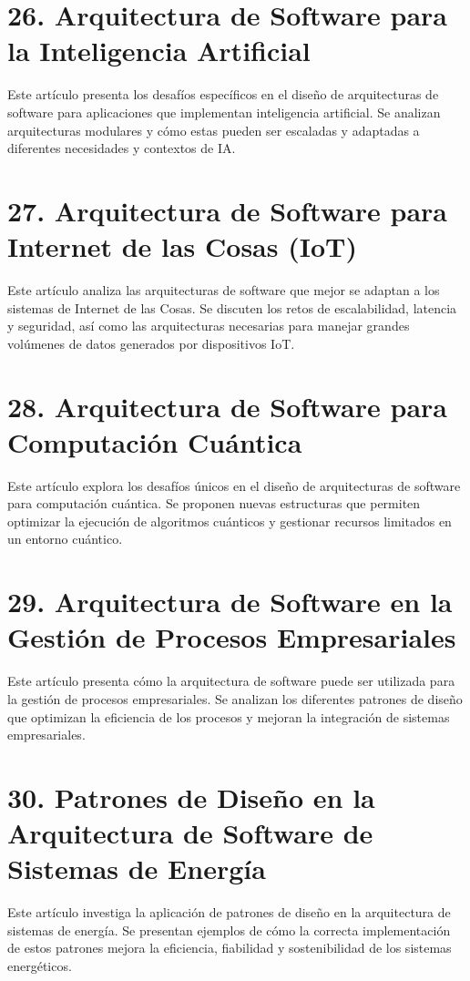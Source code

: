 \documentclass[twocolumn]{article}
\begin{document}
\printbibliography[heading=subbibliography]

\section*{26. Arquitectura de Software para la Inteligencia Artificial}
Este artículo presenta los desafíos específicos en el diseño de arquitecturas de software para aplicaciones que implementan inteligencia artificial. Se analizan arquitecturas modulares y cómo estas pueden ser escaladas y adaptadas a diferentes necesidades y contextos de IA.



\printbibliography[heading=subbibliography]

\section*{27. Arquitectura de Software para Internet de las Cosas (IoT)}
Este artículo analiza las arquitecturas de software que mejor se adaptan a los sistemas de Internet de las Cosas. Se discuten los retos de escalabilidad, latencia y seguridad, así como las arquitecturas necesarias para manejar grandes volúmenes de datos generados por dispositivos IoT.



\printbibliography[heading=subbibliography]

\section*{28. Arquitectura de Software para Computación Cuántica}
Este artículo explora los desafíos únicos en el diseño de arquitecturas de software para computación cuántica. Se proponen nuevas estructuras que permiten optimizar la ejecución de algoritmos cuánticos y gestionar recursos limitados en un entorno cuántico.


\printbibliography[heading=subbibliography]

\section*{29. Arquitectura de Software en la Gestión de Procesos Empresariales}
Este artículo presenta cómo la arquitectura de software puede ser utilizada para la gestión de procesos empresariales. Se analizan los diferentes patrones de diseño que optimizan la eficiencia de los procesos y mejoran la integración de sistemas empresariales.



\printbibliography[heading=subbibliography]

\section*{30. Patrones de Diseño en la Arquitectura de Software de Sistemas de Energía}
Este artículo investiga la aplicación de patrones de diseño en la arquitectura de sistemas de energía. Se presentan ejemplos de cómo la correcta implementación de estos patrones mejora la eficiencia, fiabilidad y sostenibilidad de los sistemas energéticos.


\printbibliography[heading=subbibliography]
\end{document}
